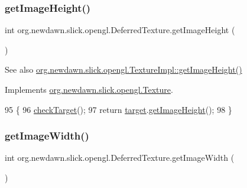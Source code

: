 \subsubsection{\texorpdfstring{get\+Image\+Height()}{getImageHeight()}}
{\footnotesize\ttfamily int org.\+newdawn.\+slick.\+opengl.\+Deferred\+Texture.\+get\+Image\+Height (\begin{DoxyParamCaption}{ }\end{DoxyParamCaption})\hspace{0.3cm}{\ttfamily [inline]}}

\begin{DoxySeeAlso}{See also}
\mbox{\hyperlink{classorg_1_1newdawn_1_1slick_1_1opengl_1_1_texture_impl_a377019eb21fcdf1d9eb340b6ca3cca12}{org.\+newdawn.\+slick.\+opengl.\+Texture\+Impl\+::get\+Image\+Height()}} 
\end{DoxySeeAlso}


Implements \mbox{\hyperlink{interfaceorg_1_1newdawn_1_1slick_1_1opengl_1_1_texture_afe73affbe5e20e047f6364ce7b61d7d2}{org.\+newdawn.\+slick.\+opengl.\+Texture}}.


\begin{DoxyCode}
95                                 \{
96         \mbox{\hyperlink{classorg_1_1newdawn_1_1slick_1_1opengl_1_1_deferred_texture_a22f14bcd9cbd4bf033e2308b90464dce}{checkTarget}}();
97         \textcolor{keywordflow}{return} \mbox{\hyperlink{classorg_1_1newdawn_1_1slick_1_1opengl_1_1_deferred_texture_aa70a4b195d0b965a0099d0e7bc18d9d2}{target}}.\mbox{\hyperlink{classorg_1_1newdawn_1_1slick_1_1opengl_1_1_texture_impl_a377019eb21fcdf1d9eb340b6ca3cca12}{getImageHeight}}();
98     \}
\end{DoxyCode}
\mbox{\label{classorg_1_1newdawn_1_1slick_1_1opengl_1_1_deferred_texture_a12271dcbc3878ff74af0aae565356904}} 
\subsubsection{\texorpdfstring{get\+Image\+Width()}{getImageWidth()}}
{\footnotesize\ttfamily int org.\+newdawn.\+slick.\+opengl.\+Deferred\+Texture.\+get\+Image\+Width (\begin{DoxyParamCaption}{ }\end{DoxyParamCaption})\hspace{0.3cm}{\ttfamily [inline]}}

